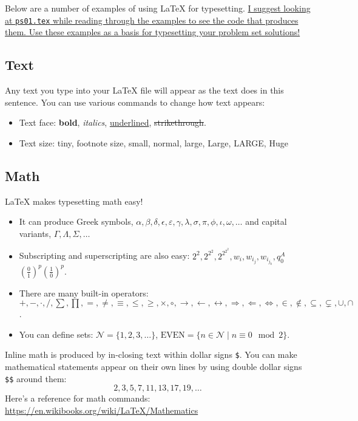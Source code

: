 \documentclass[11pt]{article}
\theoremstyle{nonumberplain}
\newcommand{\NN}{\mathcal{N}} %
\newcommand{\set}[1]{\ensuremath{\{{#1}\}}} %
\newcommand{\condset}[2]{\ensuremath{\set{{#1}\;|\;{#2}}}} %
\newcommand{\nin}{\not\in}
\newcommand{\cross}{\times} %
\newcommand{\ssn}{\subsetneq} %
\newcommand{\sse}{\subseteq} %
\begin{document}
Below are a number of examples of using \LaTeX{} for typesetting.
\ul{I suggest looking at \texttt{ps01.tex} while reading through the
  examples to see the code that produces them.  Use these examples as
  a basis for typesetting your problem set solutions!}

\subsection*{Text}

Any text you type into your \LaTeX{} file will appear as the text does
in this sentence.  You can use various commands to change how text
appears:

\begin{itemize}
\item Text face: \textbf{bold}, \emph{italics}, \ul{underlined},
  \st{strikethrough}.
\item Text size: {\tiny tiny}, {\footnotesize footnote size}, {\small
  small}, {\normalsize normal}, {\large large}, {\Large Large},
{\LARGE LARGE}, {\Huge Huge}
\end{itemize}

\subsection*{Math}

\LaTeX{} makes typesetting math easy!  
\begin{itemize}
\item It can produce Greek symbols,
$\alpha, \beta, \delta, \epsilon, \varepsilon, \gamma, \lambda,
\sigma, \pi, \phi, \iota, \omega, \ldots$ and capital variants,
$\Gamma, \Lambda, \Sigma, \ldots$ 
\item Subscripting and superscripting are
also easy: $2^2, 2^{2^2},2^{2^{2^2}}, w_i,w_{i_j},w_{i_{j_k}},q_0^A$ $\left(\frac{0}{1}\right)^p\left(\frac{1}{0}\right)^p$.
\item There are many built-in operators: $+, -, \cdot, /, \sum, \prod, =,
\neq, \equiv, \le, \ge, \cross, \circ, \rightarrow, \leftarrow,
\leftrightarrow, \Rightarrow, \Leftarrow, \Leftrightarrow, \in, \nin,
\sse, \ssn, \cup, \cap$.  
\item You can define sets: $\NN =
\set{1,2,3,\ldots}$, $\text{EVEN} = \condset{n \in \NN}{n \equiv 0
  \mod 2}$.  
\end{itemize}
Inline math is produced by in-closing text within dollar
signs \texttt{\$}.  You can make mathematical statements appear on
their own lines by using double dollar signs \texttt{\$\$} around
them:
$$2,3,5,7,11,13,17,19,\ldots$$ Here's a reference for math commands:
\url{https://en.wikibooks.org/wiki/LaTeX/Mathematics}
\end{document}
